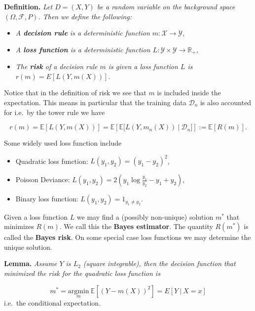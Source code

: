 \documentclass[a4paper,10pt,openany]{book}
\providecommand{\tightlist}{%
 \setlength{\itemsep}{0pt}\setlength{\parskip}{0pt}}
\begin{document}
\textbf{Definition.} \emph{Let \(D=(X,Y)\) be a random variable on the background space \((\Omega, \mathcal{F},P)\). Then we define the following:}

\begin{itemize}
\tightlist
\item
  \emph{A \textbf{decision rule} is a deterministic function \(m:\mathcal{X}\to \mathcal{Y}\),}
\item
  \emph{A \textbf{loss function} is a deterministic function \(L: \mathcal{Y}\times \mathcal{Y}\to \mathbb{R}_+\),}
\item
  \emph{The \textbf{risk} of a decision rule \(m\) is given a loss function \(L\) is \(r(m)=E[L(Y,m(X))]\).}
\end{itemize}

Notice that in the definition of risk we see that \(m\) is included inside the expectation. This means in particular that the training data \(\mathcal{D}_n\) is also accounted for i.e.~by the tower rule we have

\[
r(m)=\mathbb{E}[L(Y,m(X))]=\mathbb{E}\left[\mathbb{E}\Big[L(Y,m_n(X))\ \Big\vert\ \mathcal{D}_n\Big]\right]:=\mathbb{E}\left[R(m)\right].
\]

Some widely used loss function include

\begin{itemize}
\tightlist
\item
  Quadratic loss function: \(L(y_1,y_2)=(y_1-y_2)^2\),
\item
  Poisson Deviance: \(L(y_1,y_2)=2\left(y_1\log\frac{y_1}{y_2}-y_1+y_2\right)\),
\item
  Binary loss function: \(L(y_1,y_2)=1_{y_1\ne y_2}\).
\end{itemize}

Given a loss function \(L\) we may find a (possibly non-unique) solution \(m^*\) that minimizes \(R(m)\). We call this the \textbf{Bayes estimator}. The quantity \(R(m^*)\) is called the \textbf{Bayes risk}. On some special case loss functions we may determine the unique solution.

\textbf{Lemma.} \emph{Assume \(Y\) is \(L_2\) (square integrable), then the decision function that minimized the risk for the quadratic loss function is}

\[
m^*=\underset{m}{\text{argmin}}\ \mathbb{E}[(Y-m(X))^2]=E[Y\ \vert\ X=x]
\]
i.e.~the conditional expectation.
\end{document}
